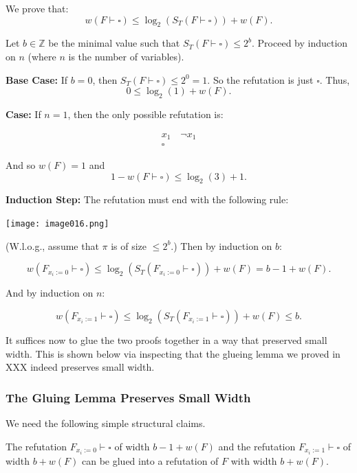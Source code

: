 We prove that:
\[
w(F \vdash \square) \leq \log_2(S_T(F \vdash \square)) + w(F).
\]

Let $b \in \mathbb{Z}$ be the minimal value such that $S_T(F \vdash \square) \leq 2^b$.  
Proceed by induction on $n$ (where $n$ is the number of variables).

\textbf{Base Case:}  
If $b = 0$, then $S_T(F \vdash \square) \leq 2^0 = 1$. So the refutation is just $\square$.  
Thus,  
\[
0 \leq \log_2(1) + w(F).
\]

\textbf{Case:} If $n = 1$, then the only possible refutation is:

\[
\begin{array}{c}
    x_1 \quad \neg x_1 \\
    \hline
    \square
\end{array}
\]

And so $w(F) = 1$ and  
\[
1 - w(F \vdash \square) \leq \log_2(3) + 1.
\]

\textbf{Induction Step:}  
The refutation must end with the following rule:

\texttt{[image: image016.png]}


(W.l.o.g., assume that $\pi$ is of size $\leq 2^b$.) Then by induction on $b$:

\[
w(F_{x_i := 0} \vdash \square) \leq \log_2(S_T(F_{x_i := 0} \vdash \square)) + w(F) = b - 1 + w(F).
\]

And by induction on $n$:

\[
w(F_{x_i := 1} \vdash \square) \leq \log_2(S_T(F_{x_i := 1} \vdash \square)) + w(F) \leq b.
\]

It suffices now to glue the two proofs together in a way that preserved small width.
This is shown below via inspecting that the glueing lemma we proved in XXX indeed preserves small width. 
\subsubsection{The Gluing Lemma Preserves Small Width }

We need the following simple structural claims.


\begin{lemma}
The refutation $F_{x_i := 0} \vdash \square$ of width $b - 1 + w(F)$  
and the refutation $F_{x_i := 1} \vdash \square$ of width $b + w(F)$  
can be glued into a refutation of $F$ with width $b + w(F)$.
\end{lemma}


